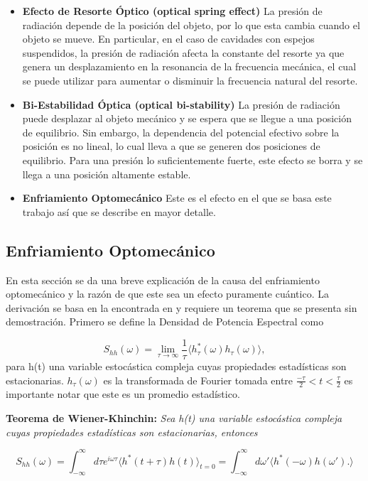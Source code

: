 \documentclass[10pt,a4paper]{report}
\begin{document}
\begin{itemize}
\item \textbf{Efecto de Resorte Óptico (optical spring effect)} La
  presión de radiación depende de la posición del objeto, por lo que esta
  cambia cuando el objeto se mueve. En particular, en el caso de
  cavidades con espejos suspendidos, la presión de radiación afecta la
  constante del resorte ya que genera un desplazamiento en la
  resonancia de la frecuencia mecánica, el cual se puede utilizar para
  aumentar o disminuir la frecuencia natural del
  resorte.\cite{BraginskyPE}

\item \textbf{Bi-Estabilidad Óptica (optical bi-stability)} La presión
  de radiación puede desplazar al objeto mecánico y se espera que se
  llegue a una posición de equilibrio. Sin embargo, la dependencia del
  potencial efectivo sobre la posición es no lineal, lo cual lleva a
  que se generen dos posiciones de equilibrio. Para una presión lo
  suficientemente fuerte, este efecto se borra y se llega a una
  posición altamente estable\cite{DorselOB}.

\item \textbf{Enfriamiento Optomecánico} Este es el efecto en el que se basa este trabajo así que se describe en mayor detalle. 
\end{itemize}

\subsection{Enfriamiento Optomecánico}

En esta sección se da una breve explicación de la causa del enfriamiento optomecánico y la razón de que este sea un efecto puramente cuántico. La derivación se basa en la encontrada en \cite{WarwickQO} y requiere un teorema que se presenta sin demostración. Primero se define la  Densidad de Potencia Espectral como

\begin{equation}
S_{hh}(\omega) = \lim_{\tau \to\infty} \frac{1}{\tau}\langle h_\tau^*(\omega)h_\tau(\omega) \rangle ,
\end{equation}
para h(t) una variable estocástica compleja cuyas propiedades estadísticas son
estacionarias. $h_\tau(\omega)$ es la
transformada de Fourier tomada entre $\frac{-\tau}{2}< t <
\frac{\tau}{2}$ es importante notar que este es un promedio estadístico.

\begin{center}
\textbf{Teorema de Wiener-Khinchin:} \textit{Sea h(t) una variable estocástica
  compleja cuyas propiedades estadísticas son estacionarias, entonces
}

\begin{equation} \label{WienerKhichin}
S_{hh}(\omega) = \int_{-\infty}^\infty d\tau e^{i\omega \tau} \langle h^*(t+\tau)h(t) \rangle_{t=0} = \int_{-\infty}^\infty d\omega' \langle h^*(-\omega) h(\omega'). \rangle
\end{equation}

\end{center}
\end{document}
